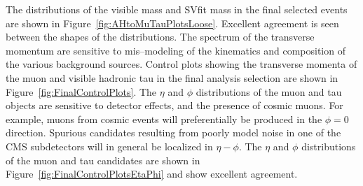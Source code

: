 %
\indent The distributions of the visible mass and SVfit mass in the final selected
events are shown in Figure~\ref{fig:AHtoMuTauPlotsLoose}.  Excellent agreement
is seen between the shapes of the distributions.   The \pt spectrum of
the transverse momentum are sensitive to mis--modeling of the kinematics and
composition of the various background sources. Control plots showing the
transverse momenta of the muon and visible hadronic tau in the final analysis
selection are shown in Figure~\ref{fig:FinalControlPlots}.  The $\eta$ and $\phi$
distributions of the muon and tau objects are sensitive to detector effects, and
the presence of cosmic muons.  For example, muons from cosmic events will
preferentially be produced in the \mbox{$\phi=0$} direction.  Spurious candidates
resulting from poorly model noise in one of the CMS subdetectors will in general
be localized in $\eta-\phi$.  The $\eta$ and $\phi$ distributions of the muon
and tau candidates are shown in Figure~\ref{fig:FinalControlPlotsEtaPhi} and
show excellent agreement.
